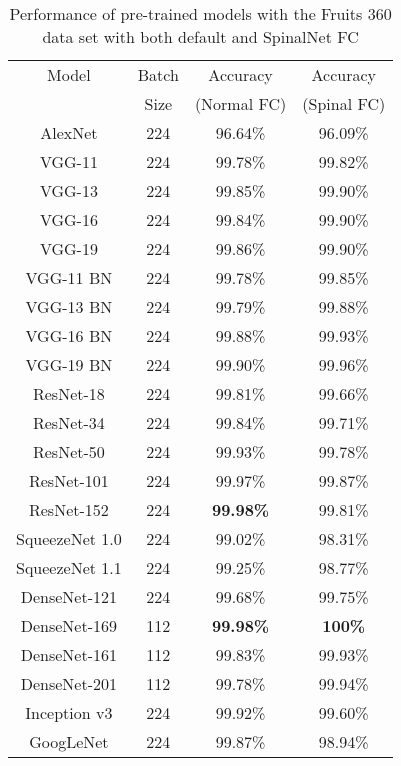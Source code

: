 \documentclass[conference]{IEEEtran}
\begin{document}
\begin{table}
		\caption{Performance of pre-trained models with the Fruits 360 data set with both default and SpinalNet FC}
		\label{Fruits_Results} \centering
\begin{tabular}{|c|c|c|c|}	\hline 

    Model & Batch   & Accuracy    & Accuracy    \\ 
          & Size    & (Normal FC) & (Spinal FC) \\
    
    \hline AlexNet & 224    &   96.64\%    & 96.09\% \\
    \hline VGG-11  & 224    &   99.78\%    & 99.82\%   \\ 
    \hline VGG-13  & 224    &   99.85\%    & 99.90\%   \\
    \hline VGG-16  & 224    &   99.84\%    & 99.90\%   \\
    \hline VGG-19  & 224    &   99.86\%    & 99.90\%   \\
    \hline VGG-11 BN    & 224    & 99.78\% & 99.85\%   \\
    \hline VGG-13 BN    & 224    & 99.79\% & 99.88\% \\
    \hline VGG-16 BN    & 224    & 99.88\% & 99.93\% \\
    \hline VGG-19 BN    & 224    & 99.90\% & 99.96\% \\
    \hline ResNet-18    & 224    & 99.81\% & 99.66\% \\
    \hline ResNet-34    & 224    & 99.84\% & 99.71\% \\
    \hline ResNet-50    & 224    & 99.93\% & 99.78\% \\
    \hline ResNet-101   & 224    & 99.97\% & 99.87\% \\
    \hline ResNet-152   & 224    & \textbf{99.98\%}  & 99.81\% \\
    \hline SqueezeNet 1.0 & 224  & 99.02\% & 98.31\% \\
    \hline SqueezeNet 1.1 & 224  & 99.25\% & 98.77\% \\
    \hline DenseNet-121   & 224  & 99.68\% & 99.75\% \\
    \hline DenseNet-169 & 112 & \textbf{99.98\%} & \textbf{100\%} \\
    \hline DenseNet-161 & 112 & 99.83\%  & 99.93\% \\
    \hline DenseNet-201 & 112 & 99.78\%  & 99.94\% \\
    \hline Inception v3 & 224 & 99.92\%  & 99.60\% \\
    \hline GoogLeNet    & 224 & 99.87\%  & 98.94\% \\

\end{tabular}
\end{table}
\end{document}
